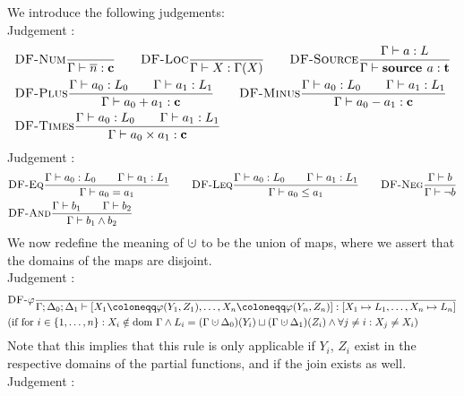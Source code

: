 We introduce the following judgements:
\\
Judgement :
\begin{align*}
    &\textsc{DF-Num}\frac{\displaystyle }{\displaystyle \Gamma \vdash {\overline{n}}: \textbf{c}}\qquad
    \textsc{DF-Loc}\frac{\displaystyle }{\displaystyle \Gamma \vdash {X}: \Gamma(X)}\qquad
    \textsc{DF-Source}\frac{\displaystyle \Gamma \vdash {a}: L}{\displaystyle \Gamma \vdash {\textbf{source }{a}}: \textbf{t}}\\
    &\textsc{DF-Plus}\frac{\displaystyle \Gamma \vdash {a_0}: L_0\qquad\Gamma \vdash {a_1}: L_1}{\displaystyle \Gamma \vdash {a_0+a_1}: \textbf{c}}\qquad
    \textsc{DF-Minus}\frac{\displaystyle \Gamma \vdash {a_0}: L_0\qquad\Gamma \vdash {a_1}: L_1}{\displaystyle \Gamma \vdash {a_0-a_1}: \textbf{c}}\\
    &\textsc{DF-Times}\frac{\displaystyle \Gamma \vdash {a_0}: L_0\qquad\Gamma \vdash {a_1}: L_1}{\displaystyle \Gamma \vdash {a_0 \times a_1}: \textbf{c}}
\end{align*}
Judgement :
\begin{align*}
    &\textsc{DF-Eq}\frac{\displaystyle \Gamma \vdash {a_0}: L_0\qquad \Gamma \vdash {a_1}: L_1}{\displaystyle \Gamma \vdash {a_0 = a_1}}\qquad
    \textsc{DF-Leq}\frac{\displaystyle \Gamma \vdash {a_0}: L_0\qquad \Gamma \vdash {a_1}: L_1}{\displaystyle \Gamma \vdash {a_0 \leq a_1}}\qquad
    \textsc{DF-Neg}\frac{\displaystyle \Gamma \vdash {b}}{\displaystyle \Gamma \vdash {\neg b}}\\
    &\textsc{DF-And}\frac{\displaystyle \Gamma \vdash {b_1}\qquad\Gamma \vdash {b_2}}{\displaystyle \Gamma \vdash {b_1 \land b_2}}\\
\end{align*}
We now redefine the meaning of $\dunion$ to be the union of maps, 
where we assert that the domains of the maps are disjoint.\\
Judgement :
\begin{align*}
    &\trule{DF-$\varphi$}{}{\typestep{\Gamma;\Delta_0;\Delta_1}{\defaultphilistn}{[X_1 \mapsto L_1, \ldots, X_n \mapsto L_n]}}\\
    &\text{(if for $i \in \{1, \ldots, n\}: X_i \notin \dom\Gamma \land L_i = (\Gamma \dunion \Delta_0)(Y_i) \join (\Gamma \dunion \Delta_1)(Z_i)
    \land \forall j \neq i: X_j \neq X_i$)}
\end{align*}
Note that this implies that this rule is only applicable if $Y_i$, $Z_i$ exist in the respective
domains of the partial functions, and if the join exists as well.\\
Judgement :
